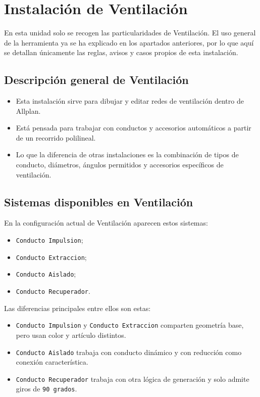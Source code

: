 ﻿\section{Instalación de Ventilación}

En esta unidad solo se recogen las particularidades de Ventilación. El uso general de la herramienta ya se ha explicado en los apartados anteriores, por lo que aquí se detallan únicamente las reglas, avisos y casos propios de esta instalación.

\subsection{Descripción general de Ventilación}

\begin{itemize}
\item Esta instalación sirve para dibujar y editar redes de ventilación dentro de Allplan.
\item Está pensada para trabajar con conductos y accesorios automáticos a partir de un recorrido polilineal.
\item Lo que la diferencia de otras instalaciones es la combinación de tipos de conducto, diámetros, ángulos permitidos y accesorios específicos de ventilación.
\end{itemize}

\subsection{Sistemas disponibles en Ventilación}

En la configuración actual de Ventilación aparecen estos sistemas:

\begin{itemize}
\item \texttt{Conducto Impulsion};
\item \texttt{Conducto Extraccion};
\item \texttt{Conducto Aislado};
\item \texttt{Conducto Recuperador}.
\end{itemize}

Las diferencias principales entre ellos son estas:

\begin{itemize}
\item \texttt{Conducto Impulsion} y \texttt{Conducto Extraccion} comparten geometría base, pero usan color y artículo distintos.
\item \texttt{Conducto Aislado} trabaja con conducto dinámico y con reducción como conexión característica.
\item \texttt{Conducto Recuperador} trabaja con otra lógica de generación y solo admite giros de \texttt{90 grados}.
\end{itemize}

